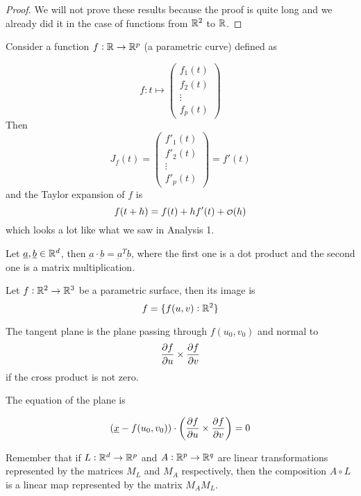 \documentclass[12pt]{report}
\renewcommand{\vec}[1]{\underbar{\ensuremath{#1}}}
\begin{document}
\begin{proof}
    We will not prove these results because the proof is quite long and we already did it in the case of functions from $\mathbb{R}^2$ to $\mathbb{R}$.
\end{proof}

\begin{example}
    Consider a function $f: \mathbb{R} \to \mathbb{R}^p$ (a parametric curve) defined as

    $$
        f : t \mapsto \begin{pmatrix}
            f_1(t) \\
            f_2(t) \\
            \vdots \\
            f_p(t)
        \end{pmatrix}
    $$
    Then
    $$
        J_f(t) = \begin{pmatrix}
            f'_1(t) \\
            f'_2(t) \\
            \vdots  \\
            f'_p(t)
        \end{pmatrix} = f'(t)
    $$
    and the Taylor expansion of $f$ is
    $$
        f(t + h) = f(t) + h f'(t) + \o(h)
    $$
    which looks a lot like what we saw in Analysis 1.
\end{example}
\begin{remark}
    Let $\vec{a}, \vec{b} \in \R^d$, then $\vec{a} \cdot \vec{b} = \vec{a}^T \vec{b}$, where the first one is a dot product and the second one is a matrix multiplication.
\end{remark}

\begin{example}
    Let $f: \mathbb{R}^2 \to \mathbb{R}^3$ be a parametric surface, then its image is
    $$
        f = \{ f(u, v) : \mathbb{R}^2 \}
    $$

    The tangent plane is the plane passing through $f(u_0, v_0)$ and normal to
    $$
        \pdv{f}{u}() \times \pdv{f}{v}()
    $$
    if the cross product is not zero.

    The equation of the plane is

    $$
        (\vec{x} - f(u_0, v_0)) \cdot \left( \pdv{f}{u}() \times \pdv{f}{v}() \right) = 0
    $$

\end{example}


\begin{remark}
    Remember that if $L: \mathbb{R}^d \to \mathbb{R}^p$ and $A: \mathbb{R}^p \to \mathbb{R}^q$ are linear transformations represented by the matrices $M_L$ and $M_A$ respectively, then the composition $A \circ L$ is a linear map represented by the matrix $M_A M_L$.
\end{remark}
\end{document}
